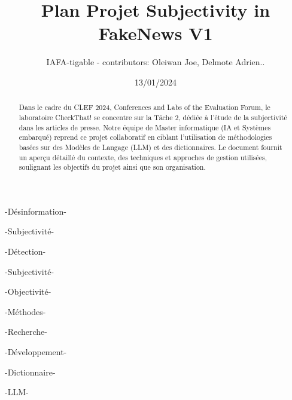 \documentclass[11pt]{rapport_class}
\title{Plan Projet Subjectivity in FakeNews V1}
\author{IAFA-tigable - contributors: Oleiwan Joe, Delmote Adrien..}
\date{13/01/2024}
\begin{document}
\maketitle

\begin{abstract}
Dans le cadre du CLEF 2024, Conferences and Labs of the Evaluation Forum, le laboratoire CheckThat! se concentre sur la Tâche 2, dédiée à l'étude de la subjectivité dans les articles de presse. Notre équipe de Master informatique (IA et Systèmes embarqué) reprend ce projet collaboratif en ciblant l'utilisation de méthodologies basées sur des Modèles de Langage (LLM) et des dictionnaires. Le document fournit un aperçu détaillé du contexte, des techniques et approches de gestion utilisées, soulignant les objectifs du projet ainsi que son organisation.
\end{abstract}

\smallskip
\begin{motsclefs}
\smallskip
\centerline{-Désinformation-}
\centerline{-Subjectivité-}
\centerline{-Détection-}
\centerline{-Subjectivité-}
\centerline{-Objectivité-}
\centerline{-Méthodes-}
\centerline{-Recherche-}
\centerline{-Développement-}
\centerline{-Dictionnaire-}
\centerline{-LLM-}
\end{motsclefs}

\tableofcontents
\end{document}
